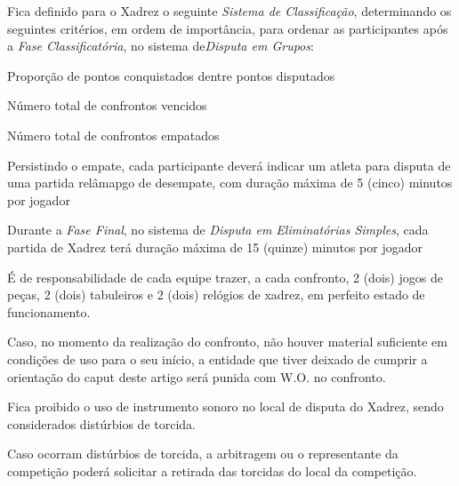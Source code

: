 \begin{article}
	Fica definido para o Xadrez o seguinte \textit{Sistema de Classificação}, determinando os seguintes critérios, em ordem de importância, para ordenar as participantes após a \textit{Fase Classificatória}, no sistema de\textit {Disputa em Grupos}:

	\begin{xparagraph}
		Proporção de pontos conquistados dentre pontos disputados
	\end{xparagraph}

	\begin{xparagraph}
		Número total de confrontos vencidos
	\end{xparagraph}

	\begin{xparagraph}
		Número total de confrontos empatados
	\end{xparagraph}

	\begin{xparagraph}
		Persistindo o empate, cada participante deverá indicar um atleta para disputa de uma partida relâmapgo de desempate, com duração máxima de 5 (cinco) minutos por jogador
	\end{xparagraph}
\end{article}

\begin{article}
	Durante a \textit{Fase Final}, no sistema de \textit{Disputa em Eliminatórias Simples}, cada partida de Xadrez terá duração máxima de 15 (quinze) minutos por jogador
\end{article}

\begin{article}
	É de responsabilidade de cada equipe trazer, a cada confronto, 2 (dois) jogos de peças, 2 (dois) tabuleiros e 2 (dois) relógios de xadrez, em perfeito estado de funcionamento.

	\begin{xparagraph}
		Caso, no momento da realização do confronto, não houver material suficiente em condições de uso para o seu início, a entidade que tiver deixado de cumprir a orientação do caput deste artigo será punida com W.O. no confronto.
	\end{xparagraph}
\end{article}

\begin{article}
	Fica proibido o uso de instrumento sonoro no local de disputa do Xadrez, sendo considerados distúrbios de torcida.

	\begin{xparagraph}
		Caso ocorram distúrbios de torcida, a arbitragem ou o representante da competição poderá solicitar a retirada das torcidas do local da competição.
	\end{xparagraph}
\end{article}
